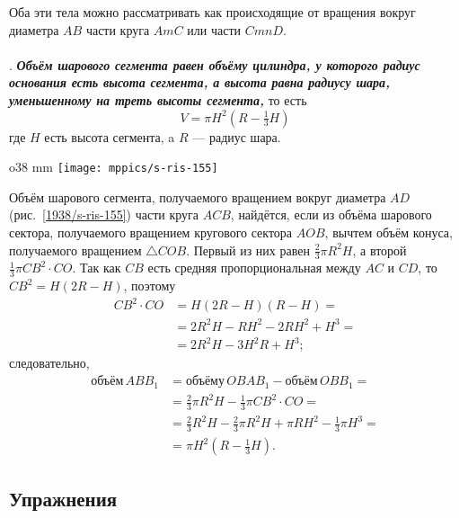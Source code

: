 Оба эти тела можно рассматривать как происходящие от вращения вокруг диаметра $AB$ части круга $AmC$ или части $CmnD$.

\paragraph{}\label{1938/s149}
.
\textbf{\emph{Объём шарового сегмента равен объёму цилиндра, у которого радиус основания есть высота сегмента, а высота равна радиусу шара, уменьшенному на треть высоты сегмента,}} то есть
\[ V = \pi H^2(R-\tfrac13 H)\]
где $H$ есть высота сегмента, a $R$ — радиус шара.


\begin{wrapfigure}{o}{38 mm}
\vskip-0mm
\centering
\texttt{[image: mppics/s-ris-155]}
\caption{}\label{1938/s-ris-155}
\vskip-0mm
\end{wrapfigure}

Объём шарового сегмента, получаемого вращением вокруг диаметра $AD$ (рис.~\ref{1938/s-ris-155}) части круга $ACB$, найдётся, если из объёма шарового сектора, получаемого вращением кругового сектора $AOB$, вычтем объём конуса, получаемого вращением $\triangle COB$.
Первый из них равен $\tfrac23\pi R^2H$, а второй $\tfrac13\pi CB^2\cdot CO$.
Так как $CB$ есть средняя пропорциональная между $AC$ и $CD$, то $CB^2 = H(2R - H)$, поэтому
\begin{align*}
CB^2\cdot CO &= H(2R - H)(R - H)=
\\
&=2R^2H - RH^2 - 2RH^2 + H^3 =
\\
&= 2R^2H-3H^2R + H^3;
\end{align*}
следовательно, 
\begin{align*}
\text{объём}\, ABB_1
&= \text{объёму}\, OBAB_1- \text{объём}\, OBB_1=
\\
&=\tfrac23\pi R^2H -\tfrac13 \pi CB^2\cdot CO = 
\\
&=\tfrac23 R^2H - \tfrac23\pi R^2H + \pi RH^2 - \tfrac13\pi H^3 = 
\\
&= \pi H^2(R-\tfrac13H).
\end{align*}

\subsection*{Упражнения}

